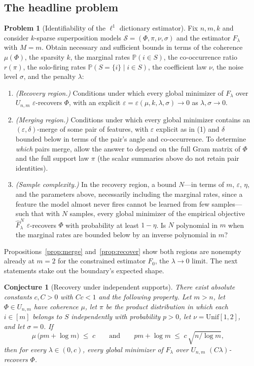 \documentclass[11pt]{amsart}
\theoremstyle{plain}
\newtheorem{conjecture}[theorem]{Conjecture}
\theoremstyle{definition}
\newtheorem{problem}[theorem]{Problem}
\newcommand{\pr}{\mathbb{P}}
\begin{document}
\subsection{The headline problem}

\begin{problem}[Identifiability of the $\ell^1$ dictionary estimator]\label{prob:main}
Fix $n,m,k$ and consider $k$-sparse superposition models $\mathcal S=(\Phi,\pi,\nu,\sigma)$ and the estimator $F_\lambda$ with $M=m$. Obtain necessary and sufficient bounds in terms of the coherence $\mu(\Phi)$, the sparsity $k$, the marginal rates $\pr(i\in S)$, the co-occurrence ratio $r(\pi)$, the solo-firing rates $\pr(S=\{i\}\mid i\in S)$, the coefficient law $\nu$, the noise level $\sigma$, and the penalty $\lambda$:
\begin{enumerate}
\item \emph{(Recovery region.)} Conditions under which every global minimizer of $F_\lambda$ over $U_{n,m}$ $\varepsilon$-recovers $\Phi$, with an explicit $\varepsilon=\varepsilon(\mu,k,\lambda,\sigma)\to0$ as $\lambda,\sigma\to0$.
\item \emph{(Merging region.)} Conditions under which every global minimizer contains an $(\varepsilon,\delta)$-merge of some pair of features, with $\varepsilon$ explicit as in (1) and $\delta$ bounded below in terms of the pair's angle and co-occurrence. To determine \emph{which} pairs merge, allow the answer to depend on the full Gram matrix of $\Phi$ and the full support law $\pi$ (the scalar summaries above do not retain pair identities).
\item \emph{(Sample complexity.)} In the recovery region, a bound $N$---in terms of $m$, $\varepsilon$, $\eta$, and the parameters above, necessarily including the marginal rates, since a feature the model almost never fires cannot be learned from few samples---such that with $N$ samples, every global minimizer of the empirical objective $\widehat F^N_\lambda$ $\varepsilon$-recovers $\Phi$ with probability at least $1-\eta$. Is $N$ polynomial in $m$ when the marginal rates are bounded below by an inverse polynomial in $m$?
\end{enumerate}
\end{problem}

Propositions~\ref{prop:merge} and~\ref{prop:recover} show both regions are nonempty already at $m=2$ for the constrained estimator $F_0$, the $\lambda\to0$ limit. The next statements stake out the boundary's expected shape.

\begin{conjecture}[Recovery under independent supports]\label{conj:independent}
There exist absolute constants $c,C>0$ with $Cc<1$ and the following property. Let $m>n$, let $\Phi\in U_{n,m}$ have coherence $\mu$, let $\pi$ be the product distribution in which each $i\in[m]$ belongs to $S$ independently with probability $p>0$, let $\nu=\mathrm{Unif}[1,2]$, and let $\sigma=0$. If
\[
  \mu\,\bigl(pm+\log m\bigr)\;\le\;c
  \qquad\text{and}\qquad
  pm+\log m\;\le\;c\,\sqrt{n/\log m},
\]
then for every $\lambda\in(0,c)$, every global minimizer of $F_\lambda$ over $U_{n,m}$ $(C\lambda)$-recovers $\Phi$.
\end{conjecture}
\end{document}
